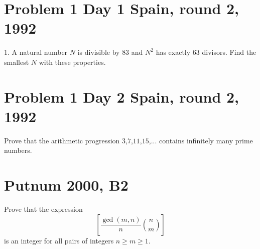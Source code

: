 \documentclass[]{article}
\title{}
\author{}
\begin{document}
\maketitle


\section{Problem 1 Day 1 Spain, round 2, 1992}
1. A natural number $N$ is divisible by $83$ and $N^2$ has exactly $63$ divisors. Find the smallest $N$ with these properties.

\section{Problem 1 Day 2 Spain, round 2, 1992}
Prove that the arithmetic progression $3$,$7$,$11$,$15$,$...$ contains infinitely many
prime numbers.

\section{Putnum 2000, B2}
Prove that the expression
$$[ \frac{\gcd(m,n)}{n}\binom{n}{m} ]$$ is an integer for all pairs of integers $n\geq m\geq 1$.
\end{document}
